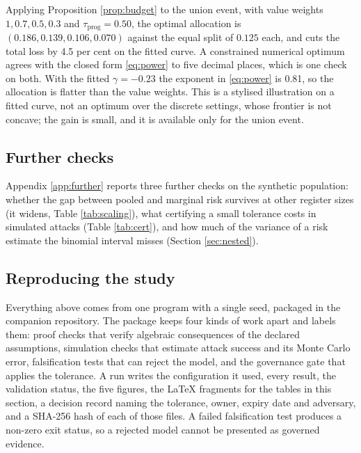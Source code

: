 \documentclass[11pt,a4paper]{article}
\theoremstyle{plain}
\theoremstyle{definition}
\theoremstyle{definition}
\theoremstyle{plain}
\begin{document}
Applying Proposition \ref{prop:budget} to the union event, with value weights
$1, 0.7, 0.5, 0.3$ and $\tau_{\mathrm{prog}} = 0.50$, the optimal allocation is
$(0.186, 0.139, 0.106, 0.070)$ against the equal split of $0.125$ each, and cuts
the total loss by 4.5 per cent on the fitted curve. A constrained numerical
optimum agrees with the closed form \eqref{eq:power} to five decimal places, which
is one check on both. With the fitted $\gamma = -0.23$ the exponent in
\eqref{eq:power} is 0.81, so the allocation is flatter than the value weights.
This is a stylised illustration on a fitted curve, not an optimum over the
discrete settings, whose frontier is not concave; the gain is small, and it is
available only for the union event.

\subsection{Further checks}

Appendix \ref{app:further} reports three further checks on the synthetic
population: whether the gap between pooled and marginal risk survives at other
register sizes (it widens, Table \ref{tab:scaling}), what certifying a small
tolerance costs in simulated attacks (Table \ref{tab:cert}), and how much of the
variance of a risk estimate the binomial interval misses (Section
\ref{sec:nested}).

\subsection{Reproducing the study}\label{sec:repro}

Everything above comes from one program with a single seed, packaged in the
companion repository. The package keeps four kinds of work apart and labels
them: proof checks that verify algebraic consequences of the declared
assumptions, simulation checks that estimate attack success and its Monte Carlo
error, falsification tests that can reject the model, and the governance gate
that applies the tolerance. A run writes the configuration it used, every
result, the validation status, the five figures, the LaTeX fragments for the
tables in this section, a decision record naming the tolerance, owner, expiry
date and adversary, and a SHA-256 hash of each of those files. A failed
falsification test produces a non-zero exit status, so a rejected model cannot
be presented as governed evidence.
\end{document}
